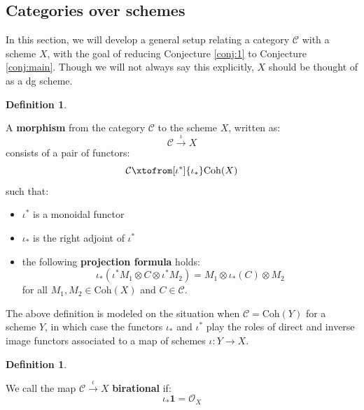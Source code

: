 \documentclass[12pt]{amsart}
\numberwithin{equation}{section}
\theoremstyle{definition}
\newtheorem{definition}[theorem]{Definition}
\theoremstyle{remark}
\newcommand{\cat}{\mathcal{C}}
\newcommand{\CO}{\mathcal{O}}
\renewcommand{\1}{\mathbf{1}}
\newcommand{\coh}{\mathrm{Coh}}
\begin{document}
 \subsection{Categories over schemes}
\label{sub:spec}

In this section, we will develop a general setup relating a category $\cat$ with a scheme $X$, with the goal of reducing Conjecture \ref{conj:1} to Conjecture \ref{conj:main}. Though we will not always say this explicitly, $X$ should be thought of as a dg scheme. 


\begin{definition}
\label{def:morphism}

A \textbf{morphism} from the category $\cat$ to the scheme $X$, written as:
$$
\cat \stackrel{\iota}\longrightarrow X
$$
consists of a pair of functors:
\begin{equation}
\label{eqn:functors}
\cat \xtofrom[\iota^*]{\iota_*} \coh(X) 
\end{equation}
such that:

\begin{itemize}

\item $\iota^*$ is a monoidal functor 

\item $\iota_*$ is the right adjoint of $\iota^*$ 

\item the following \textbf{projection formula} holds:
\begin{equation}
\label{eqn:projection}
\iota_*(\iota^*M_1 \otimes C \otimes \iota^*M_2) = M_1 \otimes \iota_*(C) \otimes M_2
\end{equation}
for all $M_1,M_2 \in \coh(X)$ and $C \in \cat$. 

\end{itemize}

\end{definition}

The above definition is modeled on the situation when $\cat = \coh(Y)$ for a scheme $Y$, in which case the functors $\iota_*$ and $\iota^*$ play the roles of direct and inverse image functors associated to a map of schemes $\iota:Y \rightarrow X$.

\begin{definition}
\label{def:birational} 

We call the map $\cat \stackrel{\iota}\longrightarrow X$ \textbf{birational} if:
\begin{equation}
\label{eqn:birational}
\iota_* \1 = \CO_X
\end{equation}

\end{definition}
\end{document}
